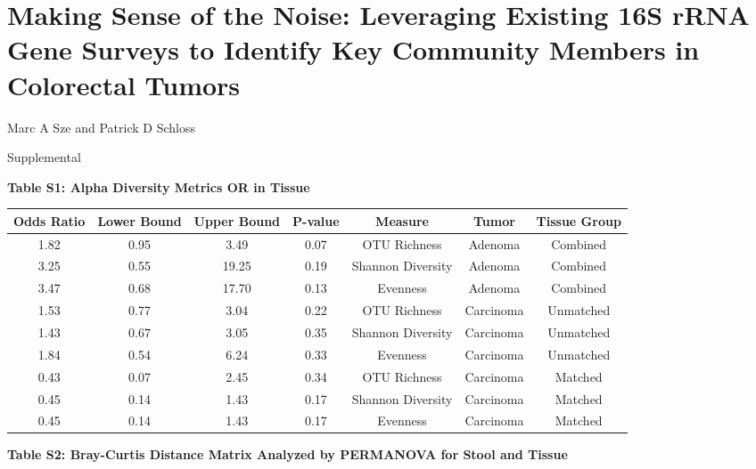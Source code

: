 \documentclass[12pt,]{article}
\title{}
\author{}
\date{}
\begin{document}
\section{Making Sense of the Noise: Leveraging Existing 16S rRNA Gene
Surveys to Identify Key Community Members in Colorectal
Tumors}\label{making-sense-of-the-noise-leveraging-existing-16s-rrna-gene-surveys-to-identify-key-community-members-in-colorectal-tumors}

\vspace{10mm}

\begin{center}
Marc A Sze and Patrick D Schloss

\vspace{10mm}

Supplemental
\end{center}

\newpage

\textbf{Table S1: Alpha Diversity Metrics OR in Tissue}

\footnotesize

\begin{longtable}[]{@{}ccccccc@{}}
\toprule
Odds Ratio & Lower Bound & Upper Bound & P-value & Measure & Tumor &
Tissue Group\tabularnewline
\midrule
\endhead
1.82 & 0.95 & 3.49 & 0.07 & OTU Richness & Adenoma &
Combined\tabularnewline
3.25 & 0.55 & 19.25 & 0.19 & Shannon Diversity & Adenoma &
Combined\tabularnewline
3.47 & 0.68 & 17.70 & 0.13 & Evenness & Adenoma &
Combined\tabularnewline
1.53 & 0.77 & 3.04 & 0.22 & OTU Richness & Carcinoma &
Unmatched\tabularnewline
1.43 & 0.67 & 3.05 & 0.35 & Shannon Diversity & Carcinoma &
Unmatched\tabularnewline
1.84 & 0.54 & 6.24 & 0.33 & Evenness & Carcinoma &
Unmatched\tabularnewline
0.43 & 0.07 & 2.45 & 0.34 & OTU Richness & Carcinoma &
Matched\tabularnewline
0.45 & 0.14 & 1.43 & 0.17 & Shannon Diversity & Carcinoma &
Matched\tabularnewline
0.45 & 0.14 & 1.43 & 0.17 & Evenness & Carcinoma &
Matched\tabularnewline
\bottomrule
\end{longtable}

\normalsize

\newpage

\textbf{Table S2: Bray-Curtis Distance Matrix Analyzed by PERMANOVA for
Stool and Tissue}
\end{document}

